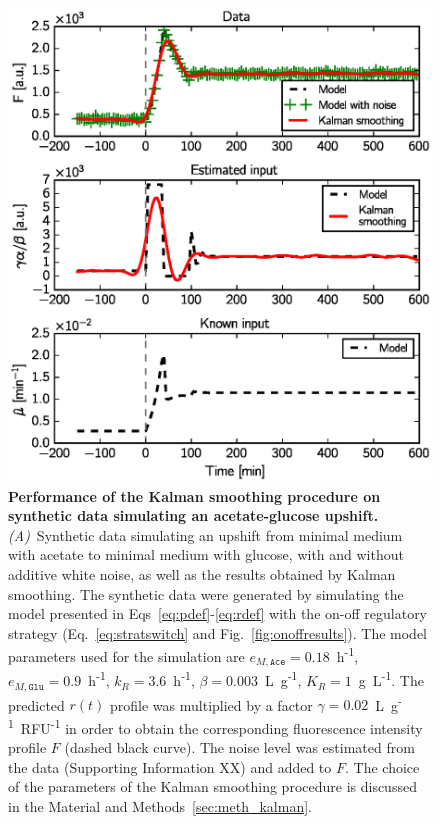 \begin{figure}[p]
\centering
\includegraphics[scale=0.8]{./Fig/synthetic_upshift}
\caption{
\textbf{Performance of the Kalman smoothing procedure on synthetic data simulating an acetate-glucose upshift.}
\textit{(A)}~Synthetic data simulating an upshift from minimal medium with acetate to minimal medium with glucose, with and without additive white noise, as well as the results obtained by Kalman smoothing.
The synthetic data were generated by simulating the model presented in Eqs~\ref{eq:pdef}-\ref{eq:rdef} with the on-off regulatory strategy (Eq.~\ref{eq:stratswitch} and Fig.~\ref{fig:onoffresults}).
The model parameters used for the simulation are $e_{M,\texttt{Ace}} = 0.18$~h\textsuperscript{-1}, $e_{M,\texttt{Glu}} = 0.9$~h\textsuperscript{-1}, $k_R = 3.6$~h\textsuperscript{-1}, $\beta = 0.003$~L~g\textsuperscript{-1}, $K_R = 1$~g~L\textsuperscript{-1}.
The predicted $r(t)$ profile was multiplied by a factor $\gamma = 0.02$~L~g\textsuperscript{-1}~RFU\textsuperscript{-1} in order to obtain the corresponding fluorescence intensity profile $F$ (dashed black curve).
The noise level was estimated from the data (Supporting Information XX) and added to $F$.
The choice of the parameters of the Kalman smoothing procedure is discussed in the Material and Methods~\ref{sec:meth_kalman}.
}
\end{figure}
